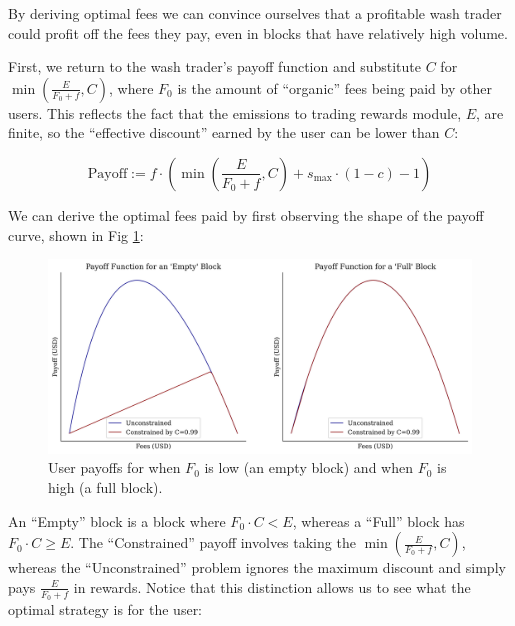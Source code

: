         By deriving optimal fees we can convince ourselves that a profitable wash trader could profit off the fees they pay, even in blocks that have relatively high volume.

        First, we return to the wash trader's payoff function and substitute $C$ for $\min{\left(\frac{E}{F_0 + f}, C\right)}$, where $F_0$ is the amount of ``organic'' fees being paid by other users. This reflects the fact that the emissions to trading rewards module, $E$, are finite, so the ``effective discount'' earned by the user can be lower than $C$:

        \begin{equation}
            \text{Payoff} := f \cdot \left(\min{\left(\frac{E}{F_0 + f}, C\right)} + s_{\text{max}} \cdot (1-c) - 1 \right)
        \end{equation}

        We can derive the optimal fees paid by first observing the shape of the payoff curve, shown in Fig \ref{fig:payoff}:

        \begin{figure}[htp]
            \centering
            \includegraphics[width=\linewidth]{figs/payoff.png}
            \caption{User payoffs for when $F_0$ is low (an empty block) and when $F_0$ is high (a full block).}
            \label{fig:payoff}
        \end{figure}

        An ``Empty'' block is a block where $F_0 \cdot C < E$, whereas a “Full” block has $F_0 \cdot C \geq E$. The ``Constrained'' payoff involves taking the $\min{\left(\frac{E}{F_0 + f}, C\right)}$, whereas the ``Unconstrained'' problem ignores the maximum discount and simply pays $\frac{E}{F_0 + f}$ in rewards. Notice that this distinction allows us to see what the optimal strategy is for the user:

